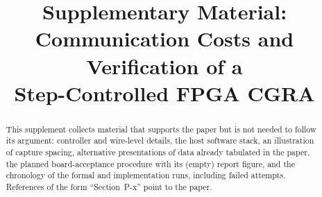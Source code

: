 \documentclass[conference]{IEEEtran}
\begin{document}
\title{Supplementary Material:\\Communication Costs and Verification of a\\
Step-Controlled FPGA CGRA}
\author{}
\maketitle

\begin{abstract}
This supplement collects material that supports the paper but is not needed
to follow its argument: controller and wire-level details, the host software
stack, an illustration of capture spacing, alternative presentations of
data already tabulated in the paper, the planned board-acceptance procedure
with its (empty) report figure, and the chronology of the formal and
implementation runs, including failed attempts. References of the form
``Section~P-x'' point to the paper.
\end{abstract}









\end{document}
